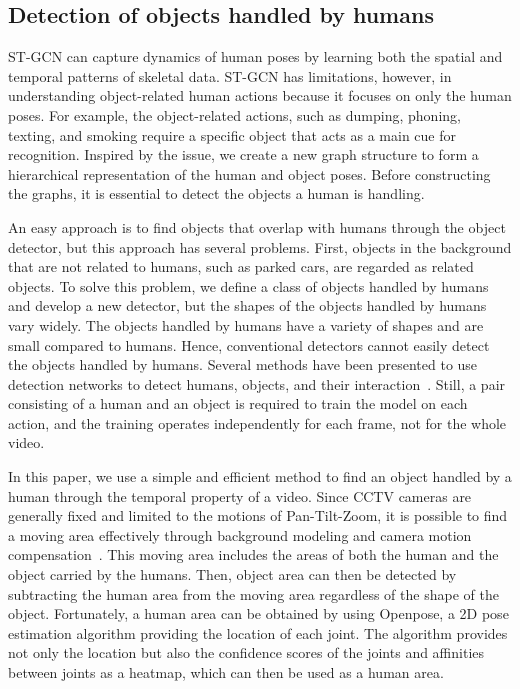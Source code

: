 \documentclass[10pt,twocolumn,letterpaper]{article}
\begin{document}
\subsection{Detection of objects handled by humans}
\label{sec:obj-detect}

ST-GCN can capture dynamics of human poses by learning both the spatial and temporal patterns of skeletal data. 
ST-GCN has limitations, however, in understanding object-related human actions because it focuses on only the human poses.
For example, the object-related actions, such as dumping, phoning, texting, and smoking require a specific object that acts as a main cue for recognition.
Inspired by the issue, we create a new graph structure to form a hierarchical representation of the human and object poses.
Before constructing the graphs, it is essential to detect the objects a human is handling.

An easy approach is to find objects that overlap with humans through the object detector, but this approach has several problems.
First, objects in the background that are not related to humans, such as parked cars, are regarded as related objects.
To solve this problem, we define a class of objects handled by humans and develop a new detector, but the shapes of the objects handled by humans vary widely.
The objects handled by humans have a variety of shapes and are small compared to humans. 
Hence, conventional detectors cannot easily detect the objects handled by humans.
Several methods have been presented to use detection networks to detect humans, objects, and their interaction~\cite{Hu:2018vj,Gkioxari:2018uv}. 
Still, a pair consisting of a human and an object is required to train the model on each action, and the training operates independently for each frame, not for the whole video.

In this paper, we use a simple and efficient method to find an object handled by a human through the temporal property of a video.
Since CCTV cameras are generally fixed and limited to the motions of Pan-Tilt-Zoom, it is possible to find a moving area effectively through background modeling and camera motion compensation~\cite{Kim:2012bo,Yi:2013gp,Yun:2017jd}.
This moving area includes the areas of both the human and the object carried by the humans. 
Then, object area can then be detected by subtracting the human area from the moving area regardless of the shape of the object. Fortunately, a human area can be obtained by using Openpose, a 2D pose estimation algorithm providing the location of each joint. The algorithm provides not only the location but also the confidence scores of the joints and affinities between joints as a heatmap, which can then be used as a human area.
\end{document}
